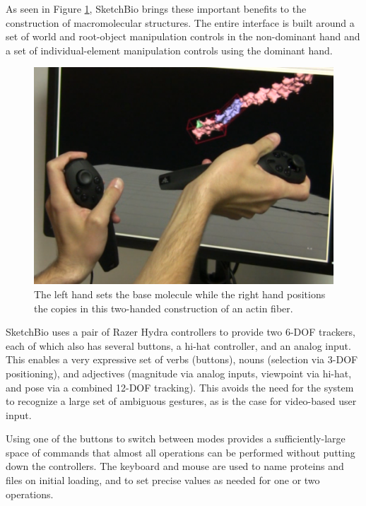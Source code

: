 \documentclass[twocolumn]{bmcart}%
\begin{document}
As seen in Figure \ref{fig:two_hands}, SketchBio brings these important benefits to the construction of macromolecular structures.  The entire interface is built around a set of world and root-object manipulation controls in the non-dominant hand and a set of individual-element manipulation controls using the dominant hand.

\begin{figure}[ht]
\centering
\includegraphics[width=0.9\columnwidth]{two_hands.png}
\caption{The left hand sets the base molecule while the right hand positions the copies in this two-handed construction of an actin fiber.}
\label{fig:two_hands}
\end{figure}

SketchBio uses a pair of Razer Hydra controllers to provide two 6-DOF trackers, each of which also has several buttons, a hi-hat controller, and an analog input.  This enables a very expressive set of verbs (buttons), nouns (selection via 3-DOF positioning), and adjectives (magnitude via analog inputs, viewpoint via hi-hat, and pose via a combined 12-DOF tracking).  This avoids the need for the system to recognize a large set of ambiguous gestures, as is the case for video-based user input.

Using one of the buttons to switch between modes provides a sufficiently-large space of commands that almost all operations can be performed without putting down the controllers.  The keyboard and mouse are used to name proteins and files on initial loading, and to set precise values as needed for one or two operations.
\end{document}
